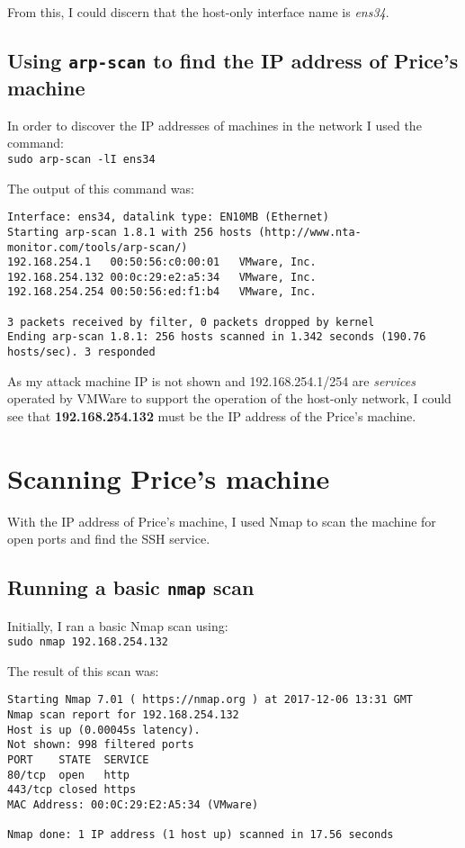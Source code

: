 \documentclass[12pt]{report}
\newcommand{\term}[1]{\colorbox{light-gray}{\texttt{#1}}}
\begin{document}
From this, I could discern that the host-only interface name is \textit{ens34}.

\subsection{Using \texttt{arp-scan} to find the IP address of Price's machine}
In order to discover the IP addresses of machines in the network I used the command:\\
\term{sudo arp-scan -lI ens34}

The output of this command was:
\begin{Verbatim}[frame=leftline, fontsize=\small]
Interface: ens34, datalink type: EN10MB (Ethernet)
Starting arp-scan 1.8.1 with 256 hosts (http://www.nta-monitor.com/tools/arp-scan/)
192.168.254.1	00:50:56:c0:00:01	VMware, Inc.
192.168.254.132	00:0c:29:e2:a5:34	VMware, Inc.
192.168.254.254	00:50:56:ed:f1:b4	VMware, Inc.

3 packets received by filter, 0 packets dropped by kernel
Ending arp-scan 1.8.1: 256 hosts scanned in 1.342 seconds (190.76 hosts/sec). 3 responded
\end{Verbatim}

As my attack machine IP is not shown and 192.168.254.1/254 are \textit{services} operated by VMWare to support the operation of the host-only network, I could see that \textbf{192.168.254.132} must be the IP address of the Price's machine.


\section{Scanning Price's machine}
With the IP address of Price's machine, I used Nmap to scan the machine for open ports and find the SSH service.
\subsection{Running a basic \texttt{nmap} scan}
Initially, I ran a basic Nmap scan using:\\
\term{sudo nmap 192.168.254.132}

The result of this scan was:
\begin{Verbatim}[frame=leftline]
Starting Nmap 7.01 ( https://nmap.org ) at 2017-12-06 13:31 GMT
Nmap scan report for 192.168.254.132
Host is up (0.00045s latency).
Not shown: 998 filtered ports
PORT    STATE  SERVICE
80/tcp  open   http
443/tcp closed https
MAC Address: 00:0C:29:E2:A5:34 (VMware)

Nmap done: 1 IP address (1 host up) scanned in 17.56 seconds
\end{Verbatim}
\end{document}
